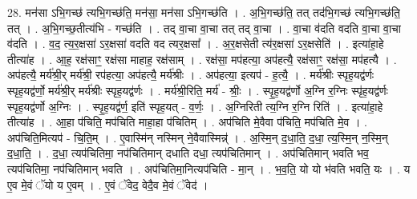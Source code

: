 \documentclass[17pt]{extarticle}
\begin{document}
28. मन॑सा ऽभि॒गच्छ॑ त्यभि॒गच्छ॑ति॒ मन॑सा॒ मन॑सा ऽभि॒गच्छ॑ति । . अ॒भि॒गच्छ॑ति॒ तत् तद॑भि॒गच्छ॑ त्यभि॒गच्छ॑ति॒ तत् । . अ॒भि॒गच्छ॒तीत्य॑भि - गच्छ॑ति । . तद् वा॒चा वा॒चा तत् तद् वा॒चा । . वा॒चा व॑दति वदति वा॒चा वा॒चा व॑दति । . व॒द॒ त्य॒र॒क्षसा॑ ऽर॒क्षसा॑ वदति वद त्यर॒क्षसा᳚ । . अ॒र॒क्षसेती त्य॑र॒क्षसा॑ ऽर॒क्षसेति॑ । . इत्या॑हा॒हे तीत्या॑ह । . आ॒ह॒ रक्ष॑साꣳ॒॒ रक्ष॑सा माहाह॒ रक्ष॑साम् । . रक्ष॑सा॒ मप॑हत्या॒ अप॑हत्यै॒ रक्ष॑साꣳ॒॒ रक्ष॑सा॒ मप॑हत्यै । . अप॑हत्यै॒ मर्य॑श्री॒र् मर्य॑श्री॒ रप॑हत्या॒ अप॑हत्यै॒ मर्य॑श्रीः । . अप॑हत्या॒ इत्यप॑ - ह॒त्यै॒ । . मर्य॑श्रीः स्पृह॒यद्व॑र्णः स्पृह॒यद्व॑र्णो॒ मर्य॑श्री॒र् मर्य॑श्रीः स्पृह॒यद्व॑र्णः । . मर्य॑श्री॒रिति॒ मर्य॑ - श्रीः॒ । . स्पृ॒ह॒यद्व॑र्णो अ॒ग्नि र॒ग्निः स्पृ॑ह॒यद्व॑र्णः स्पृह॒यद्व॑र्णो अ॒ग्निः । . स्पृ॒ह॒यद्व॑र्ण॒ इति॑ स्पृह॒यत् - व॒र्णः॒ । . अ॒ग्निरिती त्य॒ग्नि र॒ग्नि रिति॑ । . इत्या॑हा॒हे तीत्या॑ह । . आ॒हा प॑चिति॒ मप॑चिति माहा॒हा प॑चितिम् । . अप॑चिति मे॒वैवा प॑चिति॒ मप॑चिति मे॒व । . अप॑चिति॒मित्यप॑ - चि॒ति॒म् । . ए॒वास्मि॑न् नस्मिन् ने॒वैवास्मिन्न्॑ । . अ॒स्मि॒न् द॒धा॒ति॒ द॒धा॒ त्य॒स्मि॒न् न॒स्मि॒न् द॒धा॒ति॒ । . द॒धा॒ त्यप॑चितिमा॒ नप॑चितिमान् दधाति दधा॒ त्यप॑चितिमान् । . अप॑चितिमान् भवति भव॒ त्यप॑चितिमा॒ नप॑चितिमान् भवति । . अप॑चितिमा॒नित्यप॑चिति - मा॒न् । . भ॒व॒ति॒ यो यो भ॑वति भवति॒ यः । . य ए॒व मे॒वं ॅयो य ए॒वम् । . ए॒वं ॅवेद॒ वेदै॒व मे॒वं ॅवेद॑ । \newline
\end{document}
